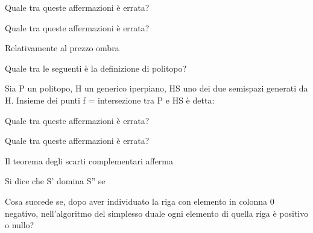 \documentclass[answers, a4paper, 11pt]{exam}
\begin{document}
\begin{questions}
\begin{solution}
\end{solution}

\question Quale tra queste affermazioni è errata?
\begin{solution}

\end{solution}

\question Quale tra queste affermazioni è errata?
\begin{solution}

\end{solution}

\question Relativamente al prezzo ombra
\begin{solution}

\end{solution}

\question Quale tra le seguenti è la definizione di politopo?
\begin{solution}

\end{solution}

\question Sia P un politopo, H un generico iperpiano, HS uno dei due semispazi generati da H. Insieme dei punti f = intersezione tra P e HS è detta:
\begin{solution}

\end{solution}

\question Quale tra queste affermazioni è errata?
\begin{solution}

\end{solution}

\question Quale tra queste affermazioni è errata?
\begin{solution}

\end{solution}

\question Il teorema degli scarti complementari afferma
\begin{solution}

\end{solution}

\question Si dice che S' domina S'' se
\begin{solution}

\end{solution}

\question Cosa succede se, dopo aver individuato la riga con elemento in colonna 0 negativo, nell'algoritmo del simplesso duale ogni elemento di quella riga è positivo o nullo?
\begin{solution}


\end{solution}
\end{questions}
\end{document}
